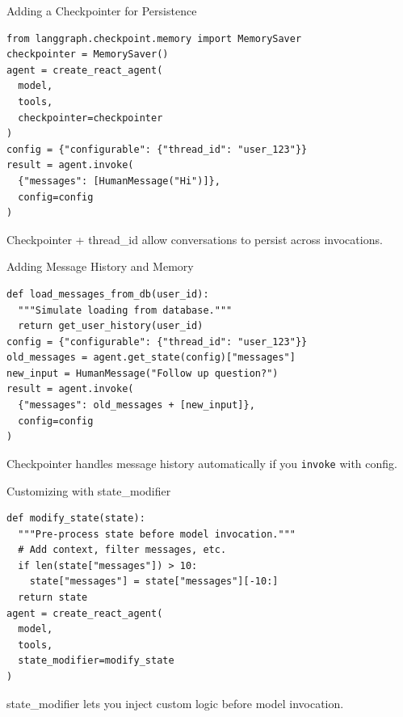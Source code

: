\documentclass[aspectratio=169,11pt]{beamer}
\begin{document}
\begin{frame}[fragile]{Adding a Checkpointer for Persistence}
  \begin{codebox}
    \begin{lstlisting}
from langgraph.checkpoint.memory import MemorySaver
checkpointer = MemorySaver()
agent = create_react_agent(
  model,
  tools,
  checkpointer=checkpointer
)
config = {"configurable": {"thread_id": "user_123"}}
result = agent.invoke(
  {"messages": [HumanMessage("Hi")]},
  config=config
)
    \end{lstlisting}
  \end{codebox}
  \vspace{0.1cm}
  \begin{tipbox}
    Checkpointer + thread\_id allow conversations to persist across invocations.
  \end{tipbox}
\end{frame}

\begin{frame}[fragile]{Adding Message History and Memory}
  \begin{codebox}
    \begin{lstlisting}
def load_messages_from_db(user_id):
  """Simulate loading from database."""
  return get_user_history(user_id)
config = {"configurable": {"thread_id": "user_123"}}
old_messages = agent.get_state(config)["messages"]
new_input = HumanMessage("Follow up question?")
result = agent.invoke(
  {"messages": old_messages + [new_input]},
  config=config
)
    \end{lstlisting}
  \end{codebox}
  \vspace{0.1cm}
  \begin{tipbox}
    Checkpointer handles message history automatically if you \texttt{invoke} with config.
  \end{tipbox}
\end{frame}

\begin{frame}[fragile]{Customizing with state\_modifier}
  \begin{codebox}
    \begin{lstlisting}
def modify_state(state):
  """Pre-process state before model invocation."""
  # Add context, filter messages, etc.
  if len(state["messages"]) > 10:
    state["messages"] = state["messages"][-10:]
  return state
agent = create_react_agent(
  model,
  tools,
  state_modifier=modify_state
)
    \end{lstlisting}
  \end{codebox}
  \vspace{0.1cm}
  \begin{tipbox}
    state\_modifier lets you inject custom logic before model invocation.
  \end{tipbox}
\end{frame}
\end{document}
